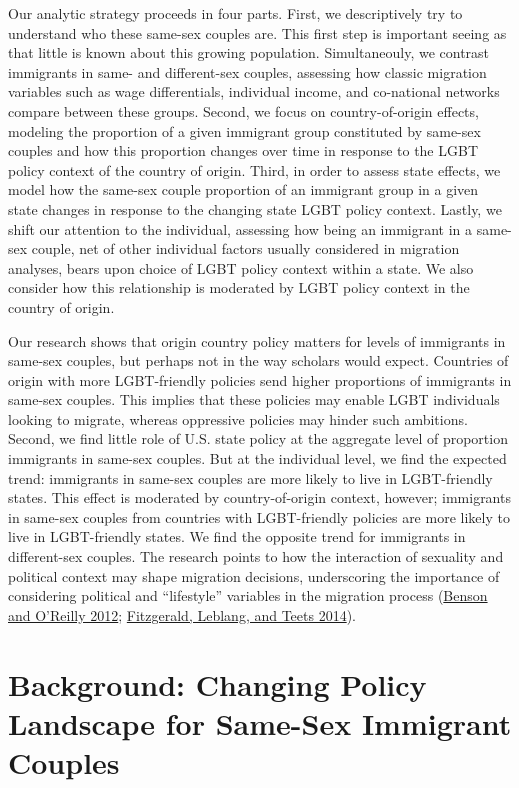 \documentclass[
  11pt,
]{article}
\begin{document}
Our analytic strategy proceeds in four parts. First, we descriptively try to understand who these same-sex couples are. This first step is important seeing as that little is known about this growing population. Simultaneouly, we contrast immigrants in same- and different-sex couples, assessing how classic migration variables such as wage differentials, individual income, and co-national networks compare between these groups. Second, we focus on country-of-origin effects, modeling the proportion of a given immigrant group constituted by same-sex couples and how this proportion changes over time in response to the LGBT policy context of the country of origin. Third, in order to assess state effects, we model how the same-sex couple proportion of an immigrant group in a given state changes in response to the changing state LGBT policy context. Lastly, we shift our attention to the individual, assessing how being an immigrant in a same-sex couple, net of other individual factors usually considered in migration analyses, bears upon choice of LGBT policy context within a state. We also consider how this relationship is moderated by LGBT policy context in the country of origin.

Our research shows that origin country policy matters for levels of immigrants in same-sex couples, but perhaps not in the way scholars would expect. Countries of origin with more LGBT-friendly policies send higher proportions of immigrants in same-sex couples. This implies that these policies may enable LGBT individuals looking to migrate, whereas oppressive policies may hinder such ambitions. Second, we find little role of U.S. state policy at the aggregate level of proportion immigrants in same-sex couples. But at the individual level, we find the expected trend: immigrants in same-sex couples are more likely to live in LGBT-friendly states. This effect is moderated by country-of-origin context, however; immigrants in same-sex couples from countries with LGBT-friendly policies are more likely to live in LGBT-friendly states. We find the opposite trend for immigrants in different-sex couples. The research points to how the interaction of sexuality and political context may shape migration decisions, underscoring the importance of considering political and ``lifestyle'' variables in the migration process (\protect\hyperlink{ref-benson_2012}{Benson and O'Reilly 2012}; \protect\hyperlink{ref-fitzgerald_2014}{Fitzgerald, Leblang, and Teets 2014}).

\hypertarget{background-changing-policy-landscape-for-same-sex-immigrant-couples}{%
\section{Background: Changing Policy Landscape for Same-Sex Immigrant Couples}\label{background-changing-policy-landscape-for-same-sex-immigrant-couples}}
\end{document}
